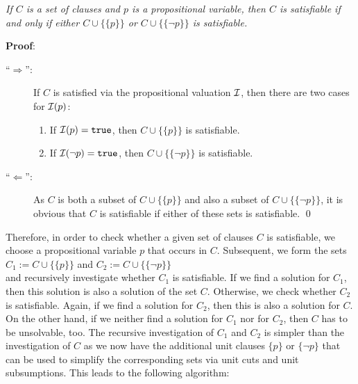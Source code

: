 \begin{Proposition}
{\em
  If $C$ is a set of clauses and $p$ is a propositional variable, then $C$ is satisfiable
  if and only if either  $C \cup \bigl\{\{p\}\bigr\}$ or $C \cup \bigl\{\{\neg p\}\bigr\}$
  is satisfiable.  
}  
\end{Proposition}

\noindent
\textbf{Proof}:
\begin{description}
    \item[``$\Rightarrow$'':]
          If  $C$ is satisfied via the propositional valuation
          $\mathcal{I}$, then there are two cases for  $\mathcal{I}(p)$:
          \begin{enumerate}
          \item If $\mathcal{I}(p) = \mathtt{true}$, then  $C \cup \bigl\{\{p\}\bigr\}$ is satisfiable.
          \item If $\mathcal{I}(\neg p) = \mathtt{true}$, then $C \cup \bigl\{\{\neg p\}\bigr\}$ is
                satisfiable. 
          \end{enumerate}
    \item[``$\Leftarrow$'':]
          As $C$ is both a subset of  $C \cup \bigl\{\{p\}\bigr\}$ and also a subset of
          $C \cup \bigl\{\{\neg p\}\bigr\}$, it is obvious
          that $C$ is satisfiable if either of these sets is satisfiable.
\qed
\end{description}

Therefore, in order to check whether a given set of clauses $C$ is satisfiable, we 
choose a propositional variable $p$ that occurs in $C$.  Subsequent, we form the sets
\\[0.2cm]
\hspace*{1.3cm} $C_1 := C \cup \bigl\{\{p\}\bigr\}$ \quad and \quad $C_2 := C \cup
\bigl\{\{\neg p\}\bigr\}$
\\[0.2cm]
and recursively investigate whether  $C_1$ is satisfiable.  If we find a solution
for $C_1$,  then this solution is also a solution of the set  $C$.  Otherwise, we check whether
$C_2$ is satisfiable.  Again, if we find a solution for $C_2$, then this is also a solution
for  $C$.  On the other hand, if we neither find a solution for $C_1$ nor for  $C_2$, then
$C$ has to be unsolvable, too.
The recursive investigation of  $C_1$ and $C_2$ is simpler than the investigation of $C$
as we now have the additional  unit clauses $\{p\}$ or $\{\neg p\}$ that can be used to
simplify the corresponding sets via unit cuts and unit subsumptions.
This leads to the following algorithm:

